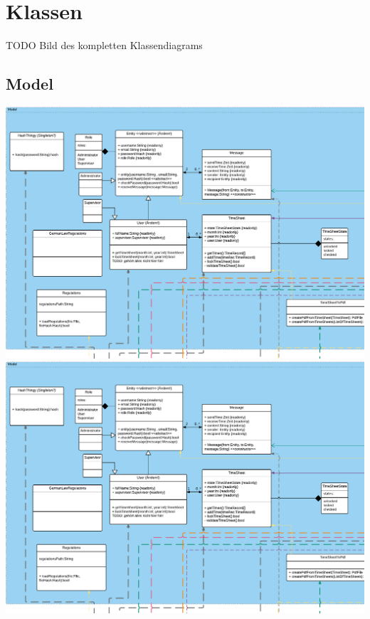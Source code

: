 \section{Klassen}
    TODO Bild des kompletten Klassendiagrams
    \newpage
    \subsection{Model}
        \includegraphics[width=\linewidth,page=1]{Diagramms/class/model.pdf}\\
        \includegraphics[width=\linewidth,page=2]{Diagramms/class/model.pdf}\\
